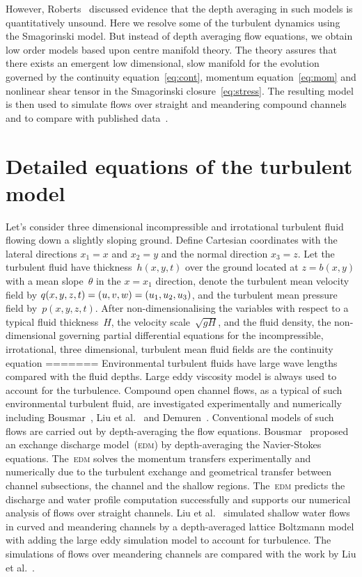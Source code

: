 \documentclass[twocolumn]{afmc_art}
\renewcommand{\vec}[1]{\text{\boldmath$#1$}}
\begin{document}
However, Roberts~\cite{Roberts1996} discussed evidence that the depth averaging in such models is quantitatively unsound.
Here we resolve some of the turbulent dynamics using the Smagorinski model.
But instead of depth averaging flow equations, we obtain low order models based upon centre manifold theory. 
The theory assures that there exists an emergent low dimensional, slow manifold for the evolution governed by the continuity equation~\eqref{eq:cont}, momentum equation~\eqref{eq:mom} and nonlinear shear tensor in the Smagorinski closure~\eqref{eq:stress}.
The resulting model is then used to simulate flows over straight and meandering compound channels and to compare with published data~\cite[e.g.]{Bousmar2002, Liu2009}.


\section{Detailed equations of the turbulent model}

Let's consider three dimensional incompressible and irrotational turbulent fluid flowing down a slightly sloping ground. 
Define Cartesian coordinates with the lateral directions $x_1=x$ and $x_2=y$ and the normal direction $x_3=z$. 
Let the turbulent fluid have thickness~$h(x,y,t)$ over the ground located at $z=b(x,y)$ with a mean slope~$\theta$ in the $x=x_1$ direction, denote the turbulent mean velocity field by $\vec q(x,y,z,t)=(u,v,w)=(u_1,u_2,u_3)$, and the turbulent mean pressure field by~$p(x,y,z,t)$.
After non-dimensionalising the variables with respect to a typical fluid thickness~$H$, the velocity scale~$\sqrt{gH}$, and the  fluid density, the non-dimensional governing partial differential equations for the incompressible, irrotational, three dimensional, turbulent mean fluid fields are the continuity equation
=======
Environmental turbulent fluids have large wave lengths compared with the fluid depths.
Large eddy viscosity model is always used to account for the turbulence.
Compound open channel flows, as a typical of such environmental turbulent fluid, are investigated experimentally and numerically including Bousmar~\cite{Bousmar2002}, Liu et al.~\cite{Liu2009} and Demuren~\cite{Demuren1993}.
Conventional models of such flows are carried out by depth-averaging the flow equations. 
Bousmar~\cite{Bousmar2002} proposed an exchange discharge model~(\textsc{edm}) by depth-averaging the Navier-Stokes equations.
The~\textsc{edm} solves the momentum transfers experimentally and numerically due to the turbulent exchange and geometrical transfer between channel subsections, the channel and the shallow regions.
The~\textsc{edm} predicts the discharge and water profile computation successfully and supports our numerical analysis of flows over straight channels. 
Liu et al.~\cite{Liu2009} simulated shallow water flows in curved and meandering channels by a depth-averaged lattice Boltzmann model with adding the large eddy simulation model to account for turbulence.
The simulations of flows over meandering channels are compared  with the work by Liu et al.~\cite{Liu2009}. 
\end{document}
